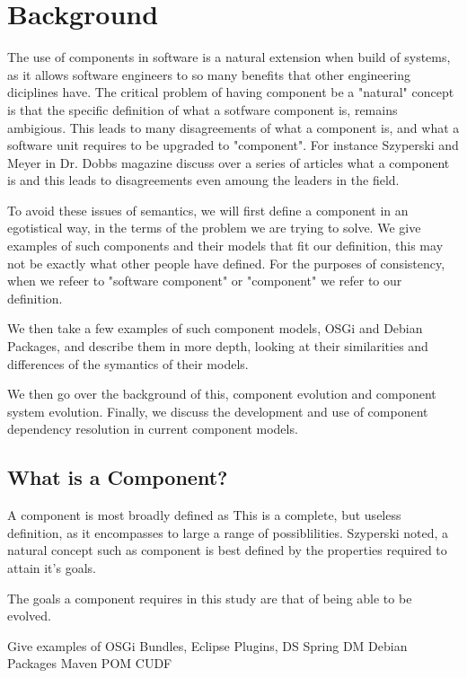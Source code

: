 \chapter{Background}
{}The use of components in software is a natural extension when build of systems, as it allows software engineers to so many benefits that other engineering diciplines have.
{}The critical problem of having component be a "natural" concept is that the specific definition of what a sotfware component is, remains ambigious.
This leads to many disagreements of what a component is, and what a software unit requires to be upgraded to "component".
For instance Szyperski and Meyer in Dr. Dobbs magazine discuss over a series of articles what a component is and this leads to disagreements even amoung the leaders in the field. %

{}To avoid these issues of semantics, we will first define a component in an egotistical way, in the terms of the problem we are trying to solve.
We give examples of such components and their models that fit our definition, this may not be exactly what other people have defined.
For the purposes of consistency, when we refeer to "software component" or "component" we refer to our definition.

We then take a few examples of such component models, OSGi and Debian Packages, and describe them in more depth, looking at their similarities and differences of the symantics of their models.

We then go over the background of this, component evolution and component system evolution.
Finally, we discuss the development and use of component dependency resolution in current component models.

\section{What is a Component?}

A component is most broadly defined as
This is a complete, but useless definition, as it encompasses to large a range of possiblilities. 
Szyperski noted, a natural concept such as component is best defined by the properties required to attain it's goals. %

The goals a component requires in this study are that of being able to be evolved.

Give examples of OSGi Bundles, Eclipse Plugins, DS
Spring DM
Debian Packages
Maven POM
CUDF

